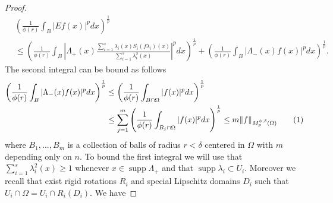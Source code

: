 \documentclass[12pt]{article}
\theoremstyle{definition}
\DeclareMathOperator\supp{supp}
\newcommand\addtag{\refstepcounter{equation}\tag{\theequation}}
\begin{document}
\begin{proof}
\begin{align*}
&\left( \frac{1}{\phi(r)} \int_B |Ef(x)|^pdx \right)^\frac{1}{p} \\
&\le\left( \frac{1}{\phi(r)} \int_B \left|\Lambda_+(x) \frac{\sum_{i=1}^s \lambda_i(x)S_i(f\lambda_i)(x)}{\sum_{i=1}^s \lambda_i^2(x)}\right|^pdx \right)^\frac{1}{p}+\left( \frac{1}{\phi(r)} \int_B |\Lambda_-(x)f(x) |^pdx \right)^\frac{1}{p}.
\end{align*}
The second integral can be bound as follows
\begin{align*}
\left( \frac{1}{\phi(r)} \int_B |\Lambda_-(x)f(x) |^pdx \right)^\frac{1}{p}&\le\left( \frac{1}{\phi(r)} \int_{B\cap\Omega} |f(x) |^pdx \right)^\frac{1}{p} \\
& \le \sum_{j=1}^m \left( \frac{1}{\phi(r)} \int_{B_j\cap\Omega} |f(x) |^pdx \right)^\frac{1}{p}\le m\|f\|_{M_p^{\phi,\delta}(\Omega)} \addtag \label{ezbound}
\end{align*}
where $B_1,...,B_m$ is a collection of balls of radius $r<\delta$ centered in $\Omega$ with $m$ depending only on $n.$ To bound the first integral we will use that $\sum_{i=1}^s \lambda_i^2(x)\ge 1$ whenever $x \in \supp \Lambda_+$ and that $\supp \lambda_i \subset U_i$. Moreover we recall that exist rigid rotations $R_i$ and special Lipschitz domains $D_i$ such that $U_i\cap \Omega=U_i\cap R_i(D_i)$. We have


\end{proof}
\end{document}
